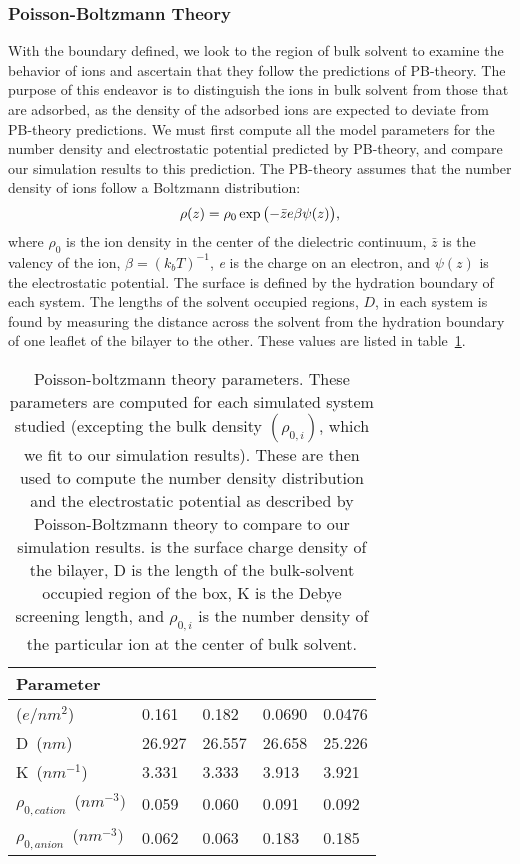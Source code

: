 \subsubsection{Poisson-Boltzmann Theory}
With the boundary defined, we look to the region of bulk solvent to examine the behavior of ions and ascertain that
they follow the predictions of PB-theory\cite{israelachvili:2011:intermol}. 
The purpose of this endeavor is to distinguish the ions in bulk solvent from those that are adsorbed,
as the density of the adsorbed ions are expected to deviate from PB-theory predictions.
We must first compute all the model parameters for the number density and electrostatic potential predicted by
PB-theory, and compare our simulation results to this prediction.
The PB-theory assumes 
that the number density of ions follow a Boltzmann distribution:
\begin{equation}
    \rho(z) = \rho_0 \exp\big({- \bar z \text{\si{\elementarycharge}} \beta \psi(z)}\big)\text{,}
    \label{eq:gcnum}
\end{equation}
where $\rho_0$ is the ion density in the center of the dielectric continuum, $\bar z$ is the valency of the ion, 
$\beta = (k_bT)^{-1}$, \si{\elementarycharge} is the charge
on an electron, and $\psi(z)$ is the electrostatic potential. The surface is defined by the hydration boundary of each system. 
The lengths of the solvent occupied regions, $D$, {in each system is} found by measuring the distance across the solvent from the 
hydration boundary of one leaflet of the bilayer to the other. 
These values are listed in table~\ref{tabch3:gctheory}.
\begin{table}
    \caption[Poisson-boltzmann theory parameters]{Poisson-boltzmann theory parameters. These parameters are computed for each
    simulated system studied (excepting the bulk density $(\rho_{0,i})$, 
    which we fit to our simulation results). These are then used to compute the
    number density distribution and the electrostatic potential as described by 
    Poisson-Boltzmann theory to compare to our simulation results.
    \sig{} is the surface charge density of the bilayer, D is the length
    of the bulk-solvent occupied region of the box, K is the Debye
    screening length, and $\rho_{0,i}$ is the number density of the particular 
    ion at the center of bulk solvent.}
    \label{tabch3:gctheory}
    \begin{tabularx}{\textwidth}{|X|X|X|X|X|}\hline
        Parameter                    & \na{}  & \li{}    & \mgmbnbfix{}    & \mgmicro{} \\\hline
        \sig{} ($e/nm^{2}$)            &0.161 &0.182   &0.0690  &0.0476     \\\hline
        D~($nm$)                     &26.927&26.557  &26.658  &25.226     \\\hline
        K~($nm^{-1}$)                &3.331 &3.333   &3.913   &3.921      \\\hline
        $\rho_{0,cation}$~($nm^{-3})$&0.059 &0.060   &0.091   &0.092      \\\hline
        $\rho_{0,anion}$~($nm^{-3})$ &0.062 &0.063   &0.183   &0.185      \\\hline
    \end{tabularx}
\end{table}
